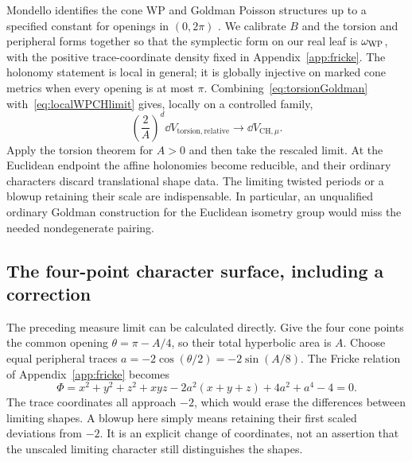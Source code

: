 Mondello identifies the cone WP and Goldman Poisson structures
up to a specified constant for openings in $(0,2\pi)$
\cite[Theorems~1.1--1.2]{MondelloCones}. We calibrate $B$ and
the torsion and peripheral forms together so that the symplectic
form on our real leaf is $\omega_{\mathrm{WP}}$, with the positive
trace-coordinate density fixed in Appendix~\ref{app:fricke}.
The holonomy statement is local in general; it is globally
injective on marked cone metrics when every opening is at
most $\pi$. Combining~\eqref{eq:torsionGoldman}
with~\eqref{eq:localWPCHlimit} gives, locally on a controlled
family,
\begin{equation}
 \boxed{\quad
 \left(\frac2A\right)^d
        \dd V_{\mathrm{torsion,relative}}
    \longrightarrow \dd V_{\mathrm{CH},\mu}.
 \quad}
 \label{eq:torsionDMlimit}
\end{equation}
Apply the torsion theorem for $A>0$ and then take the rescaled
limit. At the Euclidean endpoint the affine holonomies become
reducible, and their ordinary characters discard translational
shape data. The limiting twisted periods or a blowup retaining
their scale are indispensable. In particular, an unqualified
ordinary Goldman construction for the Euclidean isometry group
would miss the needed nondegenerate pairing.

\subsection{The four-point character surface, including a correction}

The preceding measure limit can be calculated directly. Give
the four cone points the common opening
$\theta=\pi-A/4$, so their total hyperbolic area is $A$.
Choose equal peripheral traces
$a=-2\cos(\theta/2)=-2\sin(A/8)$. The Fricke relation
of Appendix~\ref{app:fricke} becomes
\begin{equation}
 \Phi=x^2+y^2+z^2+xyz-2a^2(x+y+z)+4a^2+a^4-4=0.
 \label{eq:equalFricke}
\end{equation}
The trace coordinates all approach $-2$, which would erase
the differences between limiting shapes. A blowup here simply
means retaining their first scaled deviations from $-2$.
It is an explicit change of coordinates, not an assertion that
the unscaled limiting character still distinguishes the shapes.

